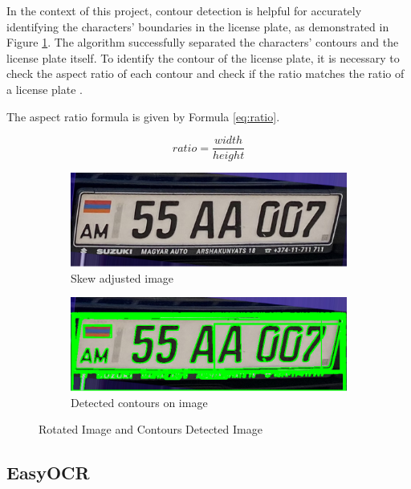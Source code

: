 \documentclass[conference]{IEEEtran}
\begin{document}
In the context of this project, contour detection is helpful for accurately identifying the characters' boundaries in the license plate, as demonstrated in Figure \ref{fig:combined8}. The algorithm successfully separated the characters' contours and the license plate itself. To identify the contour of the license plate, it is necessary to check the aspect ratio of each contour and check if the ratio matches the ratio of a license plate \cite{b19}.

The aspect ratio formula is given by Formula \ref{eq:ratio}.

\begin{equation}
    ratio = \frac{width}{height}
    \label{eq:ratio}
\end{equation}

\begin{figure}[ht]
  \centering
  \begin{subfigure}[b]{0.45\linewidth}
    \includegraphics[width=\linewidth]{images/Picture28.png}
    \caption{Skew adjusted image}
  \end{subfigure}
  \begin{subfigure}[b]{0.45\linewidth}
    \includegraphics[width=\linewidth]{images/Picture29.png}
    \caption{Detected contours on image}
  \end{subfigure}
  \caption{ Rotated Image and Contours Detected Image}
  \label{fig:combined8}
\end{figure}

\subsection{EasyOCR}
\end{document}
